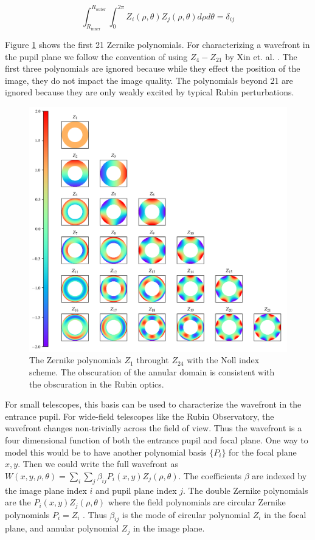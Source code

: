 \begin{equation}\label{eqn:zernike_norm}
\int_{R_{\text{inner}}}^{R_{\text{outer}}} \int_0^{2\pi} Z_i(\rho,\theta)Z_j(\rho,\theta)d\rho d\theta = \delta_{ij}
\end{equation}

\noindent Figure \ref{fig:zernike} shows the first 21 Zernike polynomials. For characterizing a wavefront in the pupil plane we follow the convention of using $Z_4-Z_{21}$ by Xin et. al. \cite{2015Xin}. The first three polynomials are ignored because while they effect the position of the image, they do not impact the image quality. The polynomials beyond 21 are ignored because they are only weakly excited by typical Rubin perturbations.

\begin{figure}[hbt!]
\centering
\includegraphics[width=14cm, keepaspectratio]{figs/new_paradigm/zernikes.png}
\caption[Zernike polynomials]{The Zernike polynomials $Z_1$ throught $Z_24$ with the Noll index scheme. The obscuration of the annular domain is consistent with the obscuration in the Rubin optics.}
\label{fig:zernike}
\end{figure}

For small telescopes, this basis can be used to characterize the wavefront in the entrance pupil. For wide-field telescopes like the Rubin Observatory, the wavefront changes non-trivially across the field of view. Thus the wavefront is a four dimensional function of both the entrance pupil and focal plane. One way to model this would be to have another polynomial basis $\{P_i\}$ for the focal plane $x,y$. Then we could write the full wavefront as $W(x,y,\rho, \theta) = \sum_i \sum_j \beta_{ij} P_i(x,y) Z_j(\rho, \theta)$. The coefficients $\beta$ are indexed by the image plane index $i$ and pupil plane index $j$. The double Zernike polynomials are the $P_i(x,y) Z_j(\rho, \theta)$ where the field polynomials are circular Zernike polynomials $P_i = Z_i$ \cite{doublezernike}. Thus $\beta_{ij}$ is the mode of circular polynomial $Z_i$ in the focal plane, and annular polynomial $Z_j$ in the image plane.

